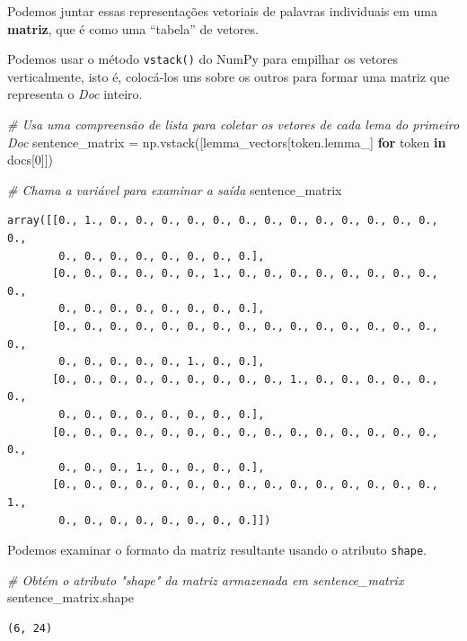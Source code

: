 \documentclass[
  brazilian,
]{article}
\newenvironment{Shaded}{}{}
\newcommand{\CommentTok}[1]{\textcolor[rgb]{0.38,0.63,0.69}{\textit{#1}}}
\newcommand{\ControlFlowTok}[1]{\textcolor[rgb]{0.00,0.44,0.13}{\textbf{#1}}}
\newcommand{\DecValTok}[1]{\textcolor[rgb]{0.25,0.63,0.44}{#1}}
\newcommand{\KeywordTok}[1]{\textcolor[rgb]{0.00,0.44,0.13}{\textbf{#1}}}
\newcommand{\NormalTok}[1]{#1}
\newcommand{\OperatorTok}[1]{\textcolor[rgb]{0.40,0.40,0.40}{#1}}
\begin{document}
Podemos juntar essas representações vetoriais de palavras individuais em
uma \textbf{matriz}, que é como uma ``tabela'' de vetores.

Podemos usar o método \texttt{vstack()} do NumPy para empilhar os
vetores verticalmente, isto é, colocá-los uns sobre os outros para
formar uma matriz que representa o \emph{Doc} inteiro.

\begin{Shaded}
\begin{Highlighting}[]
\CommentTok{\# Usa uma compreensão de lista para coletar os vetores de cada lema do primeiro Doc}
\NormalTok{sentence\_matrix }\OperatorTok{=}\NormalTok{ np.vstack([lemma\_vectors[token.lemma\_] }\ControlFlowTok{for}\NormalTok{ token }\KeywordTok{in}\NormalTok{ docs[}\DecValTok{0}\NormalTok{]])}

\CommentTok{\# Chama a variável para examinar a saída}
\NormalTok{sentence\_matrix}
\end{Highlighting}
\end{Shaded}

\begin{verbatim}
array([[0., 1., 0., 0., 0., 0., 0., 0., 0., 0., 0., 0., 0., 0., 0., 0.,
        0., 0., 0., 0., 0., 0., 0., 0.],
       [0., 0., 0., 0., 0., 0., 1., 0., 0., 0., 0., 0., 0., 0., 0., 0.,
        0., 0., 0., 0., 0., 0., 0., 0.],
       [0., 0., 0., 0., 0., 0., 0., 0., 0., 0., 0., 0., 0., 0., 0., 0.,
        0., 0., 0., 0., 0., 1., 0., 0.],
       [0., 0., 0., 0., 0., 0., 0., 0., 0., 1., 0., 0., 0., 0., 0., 0.,
        0., 0., 0., 0., 0., 0., 0., 0.],
       [0., 0., 0., 0., 0., 0., 0., 0., 0., 0., 0., 0., 0., 0., 0., 0.,
        0., 0., 0., 1., 0., 0., 0., 0.],
       [0., 0., 0., 0., 0., 0., 0., 0., 0., 0., 0., 0., 0., 0., 0., 1.,
        0., 0., 0., 0., 0., 0., 0., 0.]])
\end{verbatim}

Podemos examinar o formato da matriz resultante usando o atributo
\texttt{shape}.

\begin{Shaded}
\begin{Highlighting}[]
\CommentTok{\# Obtém o atributo "shape" da matriz armazenada em \textquotesingle{}sentence\_matrix\textquotesingle{}}
\NormalTok{sentence\_matrix.shape}
\end{Highlighting}
\end{Shaded}

\begin{verbatim}
(6, 24)
\end{verbatim}
\end{document}
